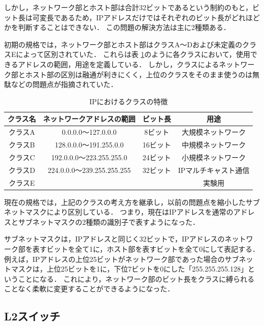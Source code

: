 しかし，ネットワーク部とホスト部は合計32ビットであるという制約のもと，ビット長は可変長であるため，IPアドレスだけではそれぞれのビット長がどれほどかを判断することはできない．
この問題の解決方法は主に2種類ある．

初期の規格では，ネットワーク部とホスト部はクラスA～Dおよび未定義のクラスEによって区別されていた．
これらは表 \ref{tab:2-3}のように各クラスにおいて，使用できるアドレスの範囲，用途を定義している．
しかし，クラスによるネットワーク部とホスト部の区別は融通が利きにくく，上位のクラスをそのまま使うのは無駄などの問題点が指摘されていた．

\begin{table}[tb]
	\begin{center}
		\caption{IPにおけるクラスの特徴}
		\begin{tabular}{c|c|c|c}
			\hline
			クラス名 & ネットワークアドレスの範囲 & ビット長 & 用途　\\ \hline \hline
			クラスA & 0.0.0.0～127.0.0.0 & 8ビット & 大規模ネットワーク\\ \hline
			クラスB & 128.0.0.0～191.255.0.0 & 16ビット & 中規模ネットワーク \\ \hline
			クラスC & 192.0.0.0～223.255.255.0 & 24ビット & 小規模ネットワーク \\ \hline
			クラスD & 224.0.0.0～239.255.255.255 & 32ビット & IPマルチキャスト通信\\ \hline
			クラスE & & & 実験用　\\ \hline
		\end{tabular}
		\label{tab:2-3}
	\end{center}
\end{table}

現在の規格では，上記のクラスの考え方を継承し，以前の問題点を縮小したサブネットマスクにより区別している．
つまり，現在はIPアドレスを通常のアドレスとサブネットマスクの2種類の識別子で表すようになった．

サブネットマスクは，IPアドレスと同じく32ビットで，IPアドレスのネットワーク部を表すビットを全て1に，ホスト部を表すビットを全て0にして表記する．
例えば，IPアドレスの上位25ビットがネットワーク部であった場合のサブネットマスクは，上位25ビットを1に，下位7ビットを0にした「255.255.255.128」ということになる．
これにより，ネットワーク部のビット長をクラスに縛られることなく柔軟に変更することができるようになった．

\subsection{L2スイッチ}

